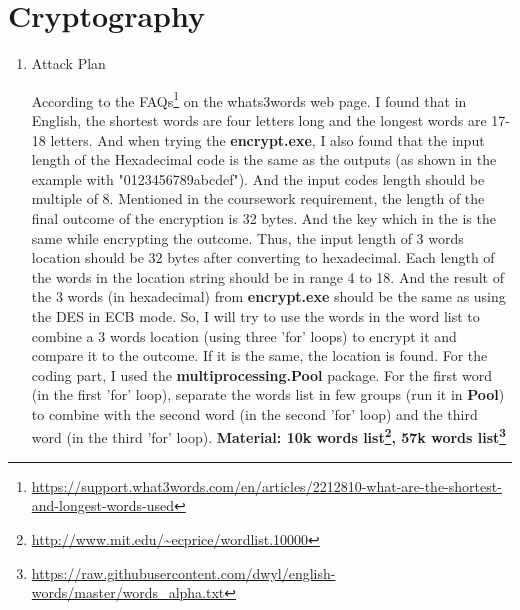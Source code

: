 \documentclass[margin 2cm]{report}
\begin{document}
\newpage
\Large\section[2]{Cryptography}

\begin{enumerate}
\normalsize\item[1)]{Attack Plan}
\begin{spacing}{1.5}
\newline\normalsize\indent\setlength{\parindent}{2em}According to the FAQs\footnote[2]{\url{https://support.what3words.com/en/articles/2212810-what-are-the-shortest-and-longest-words-used}} on the whats3words web page. I found that in English, the shortest words are four letters long and the longest words are 17-18 letters. And when trying the \textbf{encrypt.exe}, I also found that the input length of the Hexadecimal code is the same as the outputs (as shown in the example with "0123456789abcdef"). And the input codes length should be multiple of 8. \newline Mentioned in the coursework requirement, the length of the final outcome of the encryption is 32 bytes. And the key which in the  is the same while encrypting the outcome. \newline Thus, the input length of 3 words location should be 32 bytes after converting to hexadecimal. Each length of the words in the location string should be in range 4 to 18. And the result of the 3 words (in hexadecimal) from \textbf{encrypt.exe} should be the same as using the DES in ECB mode. So, I will try to use the words in the word list to combine a 3 words location (using three 'for' loops) to encrypt it and compare it to the outcome. If it is the same, the location is found. For the coding part, I used the \textbf{multiprocessing.Pool} package. For the first word (in the first 'for' loop), separate the words list in few groups (run it in \textbf{Pool}) to combine with the second word (in the second 'for' loop)  and the third word (in the third 'for' loop). \newline\textbf{Material: 10k words list\footnote[3]{\url{http://www.mit.edu/~ecprice/wordlist.10000}}, 57k words list\footnote[4]{\url{https://raw.githubusercontent.com/dwyl/english-words/master/words_alpha.txt}}}
\end{spacing}



\end{enumerate}
\end{document}
